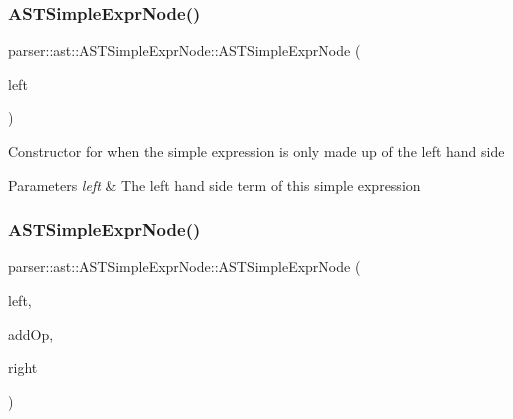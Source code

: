 \subsubsection{\texorpdfstring{A\+S\+T\+Simple\+Expr\+Node()}{ASTSimpleExprNode()}\hspace{0.1cm}{\footnotesize\ttfamily [1/2]}}
{\footnotesize\ttfamily parser\+::ast\+::\+A\+S\+T\+Simple\+Expr\+Node\+::\+A\+S\+T\+Simple\+Expr\+Node (\begin{DoxyParamCaption}\item[{std\+::unique\+\_\+ptr$<$ \hyperlink{classparser_1_1ast_1_1ASTTermNode}{A\+S\+T\+Term\+Node} $>$}]{left }\end{DoxyParamCaption})}

Constructor for when the simple expression is only made up of the left hand side 
\begin{DoxyParams}{Parameters}
{\em left} & The left hand side term of this simple expression \\
\hline
\end{DoxyParams}
\mbox{\label{classparser_1_1ast_1_1ASTSimpleExprNode_a2aa80137757c84581176e8e7e953811e}} 
\subsubsection{\texorpdfstring{A\+S\+T\+Simple\+Expr\+Node()}{ASTSimpleExprNode()}\hspace{0.1cm}{\footnotesize\ttfamily [2/2]}}
{\footnotesize\ttfamily parser\+::ast\+::\+A\+S\+T\+Simple\+Expr\+Node\+::\+A\+S\+T\+Simple\+Expr\+Node (\begin{DoxyParamCaption}\item[{std\+::unique\+\_\+ptr$<$ \hyperlink{classparser_1_1ast_1_1ASTTermNode}{A\+S\+T\+Term\+Node} $>$}]{left,  }\item[{Additive\+Op}]{add\+Op,  }\item[{std\+::unique\+\_\+ptr$<$ \hyperlink{classparser_1_1ast_1_1ASTTermNode}{A\+S\+T\+Term\+Node} $>$}]{right }\end{DoxyParamCaption})}

